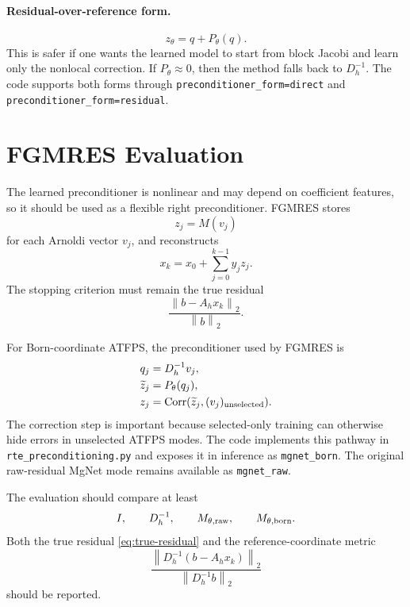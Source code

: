 \documentclass[11pt]{article}
\newcommand{\norm}[1]{\left\lVert #1 \right\rVert}
\begin{document}
\paragraph{Residual-over-reference form.}
\begin{equation}
  z_\theta = q + P_\theta(q).
  \label{eq:residual-form}
\end{equation}
This is safer if one wants the learned model to start from block Jacobi and
learn only the nonlocal correction.  If \(P_\theta\approx0\), then the method
falls back to \(D_h^{-1}\).  The code supports both forms through
\texttt{preconditioner\_form=direct} and \texttt{preconditioner\_form=residual}.

\section{FGMRES Evaluation}

The learned preconditioner is nonlinear and may depend on coefficient features,
so it should be used as a flexible right preconditioner.  FGMRES stores
\[
  z_j = M(v_j)
\]
for each Arnoldi vector \(v_j\), and reconstructs
\[
  x_k = x_0 + \sum_{j=0}^{k-1} y_j z_j.
\]
The stopping criterion must remain the true residual
\begin{equation}
  \frac{\norm{b-A_h x_k}_2}{\norm{b}_2}.
  \label{eq:true-residual}
\end{equation}

For Born-coordinate ATFPS, the preconditioner used by FGMRES is
\begin{align}
  q_j &= D_h^{-1}v_j,\\
  \widetilde z_j &= P_\theta(q_j),\\
  z_j &= \operatorname{Corr}(\widetilde z_j,(v_j)_{\rm unselected}).
  \label{eq:fgmres-born-preconditioner}
\end{align}
The correction step is important because selected-only training can otherwise
hide errors in unselected ATFPS modes.  The code implements this pathway in
\texttt{rte\_preconditioning.py} and exposes it in inference as
\texttt{mgnet\_born}.  The original raw-residual MgNet mode remains available
as \texttt{mgnet\_raw}.

The evaluation should compare at least
\[
  I,\qquad D_h^{-1},\qquad M_{\theta,{\rm raw}},\qquad M_{\theta,{\rm born}}.
\]
Both the true residual \eqref{eq:true-residual} and the reference-coordinate
metric
\begin{equation}
  \frac{\norm{D_h^{-1}(b-A_h x_k)}_2}{\norm{D_h^{-1}b}_2}
  \label{eq:d-metric}
\end{equation}
should be reported.
\end{document}
